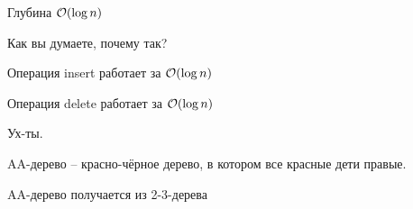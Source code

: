 



\begin{Thm}{Глубина $\mathcal{O}(\log n)$}

  Как вы думаете, почему так?
  
  \begin{Rem} Операция insert работает за $\mathcal{O}(\log n)$ \end{Rem}
  \begin{Rem} Операция delete работает за $\mathcal{O}(\log n)$ \end{Rem}

  Ух-ты.
\end{Thm}

\begin{Def}{AA-дерево} -- красно-чёрное дерево, в котором все красные дети правые.

\begin{Thm}{AA-дерево получается из 2-3-дерева}
\end{Thm}

\end{Def}
